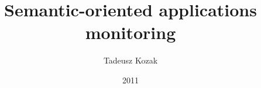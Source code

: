 \documentclass[en]{aghMasters}
\author{Tadeusz Kozak}
\title{Semantic-oriented applications monitoring}
\date{2011}
\begin{document}
\titlepages



\tableofcontents
\clearpage









\listoffigures
\listoftables

\end{document}
